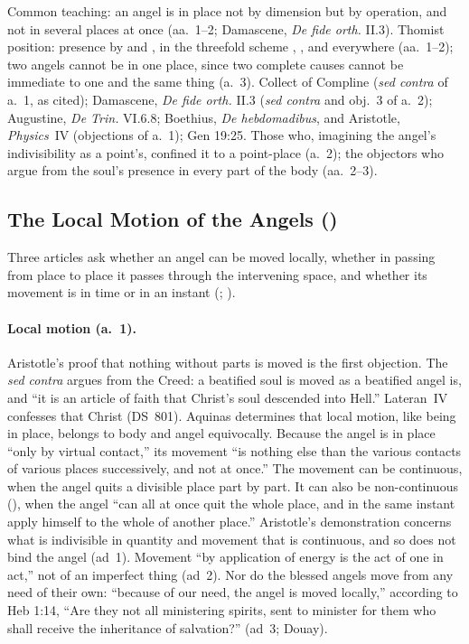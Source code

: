  {Common teaching: an angel is in place not by dimension but by
 operation, and not in several places at once (aa.~1--2; Damascene,
 \emph{De fide orth.} II.3). Thomist position: presence by
  and , in the
 threefold scheme , , and
 everywhere (aa.~1--2); two angels cannot be in one place, since two
 complete causes cannot be immediate to one and the same thing (a.~3).}
 {Collect of Compline (\emph{sed contra} of a.~1, as cited); Damascene,
 \emph{De fide orth.} II.3 (\emph{sed contra} and obj.~3 of a.~2);
 Augustine, \emph{De Trin.} VI.6.8; Boethius, \emph{De hebdomadibus}, and
 Aristotle, \emph{Physics}~IV (objections of a.~1); Gen 19:25.}
 {Those who, imagining the angel's indivisibility as a point's, confined
 it to a point-place (a.~2); the objectors who argue from the soul's
 presence in every part of the body (aa.~2--3).}

\subsection{The Local Motion of the Angels ()}\label{sec:q53}

Three articles ask whether an angel can be moved locally, whether in
passing from place to place it passes through the intervening space, and
whether its movement is in time or in an instant (; ).

\paragraph{Local motion (a.~1).} Aristotle's proof that nothing without
parts is moved is the first objection. The \emph{sed contra} argues from
the Creed: a beatified soul is moved as a beatified angel is, and ``it is
an article of faith that Christ's soul descended into Hell.'' Lateran~IV
confesses that Christ  (DS~801). Aquinas determines that local motion, like being in
place, belongs to body and angel equivocally. Because the angel is in
place ``only by virtual contact,'' its movement ``is nothing else than the
various contacts of various places successively, and not at once.'' The
movement can be continuous, when the angel quits a divisible place part by
part. It can also be non-continuous (), when the
angel ``can all at once quit the whole place, and in the same instant apply
himself to the whole of another place.'' Aristotle's demonstration
concerns what is indivisible in quantity and movement that is continuous,
and so does not bind the angel (ad~1). Movement ``by application of
energy is the act of one in act,'' not of an imperfect thing (ad~2).
Nor do the blessed angels move from any need of their own: ``because of
our need, the angel is moved locally,'' according to Heb 1:14, ``Are they
not all ministering spirits, sent to minister for them who shall receive
the inheritance of salvation?'' (ad~3; Douay).

